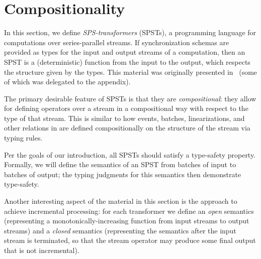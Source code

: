 \chapter{Compositionality}
\label{cha:composition}

In this section, we define \emph{SPS-transformers} (SPSTs), a programming language for computations over series-parallel streams.
If synchronization schemas are provided as types for the input and output streams of a computation,
then an SPST is a (deterministic) function from the input to the output, which respects the structure given by the types. This material was originally presented in~ (some of which was delegated to the appendix).

The primary desirable feature of SPSTs is that they are \emph{compositional}: they allow for defining operators over a stream in a compositional way with respect to the type of that stream.
This is similar to how events, batches, linearizations, and other relations in  are defined compositionally on the structure of the stream via typing rules.

Per the goals of our introduction, all SPSTs should satisfy a type-safety property.
Formally, we will define the semantics of an SPST from batches of input to batches of output; the typing judgments for this semantics then demonstrate type-safety.

Another interesting aspect of the material in this section is the approach to achieve incremental processing: for each transformer we define an \emph{open} semantics (representing a monotonically-increasing function from input streams to output streams) and a \emph{closed} semantics (representing the semantics after the input stream is terminated, so that the stream operator may produce some final output that is not incremental).

